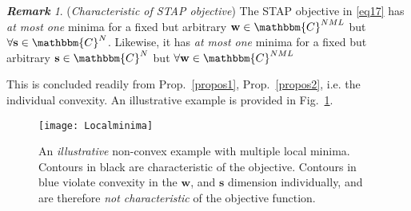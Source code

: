 \documentclass[11pt,draftclsnofoot,onecolumn]{IEEEtran}
\theoremstyle{definition}
\theoremstyle{remark}
\newtheorem{remk}{\bf Remark}
\begin{document}
\begin{remk}\label{remarkstapobj} 
({\it Characteristic of STAP objective}) The STAP objective in \eqref{eq17} has {\it at most one} minima for a fixed but arbitrary $\mathbf{w}\in\mathbbm{C}^{NML}$ but $\forall \mathbf{s} \in\mathbbm{C}^{N}$. Likewise, it has {\it at most one} minima for a fixed but arbitrary $\mathbf{s}\in\mathbbm{C}^{N}$ but $\forall \mathbf{w} \in\mathbbm{C}^{NML}$
\end{remk}
This is concluded readily from Prop.~\ref{propos1}, Prop.~\ref{propos2}, i.e. the individual convexity. An illustrative example is provided in Fig.~\ref{figlocalmin}.
\begin{figure} [htbp!]
\centering
\texttt{[image: Localminima]}
\caption{An {\it illustrative} non-convex example with multiple local minima. Contours in black are characteristic of the objective. Contours in blue violate convexity in the $\mathbf{w}$, and $\mathbf{s}$ dimension individually, and are therefore {\it not characteristic} of the objective function.}
\label{figlocalmin}
\end{figure}
\end{document}

